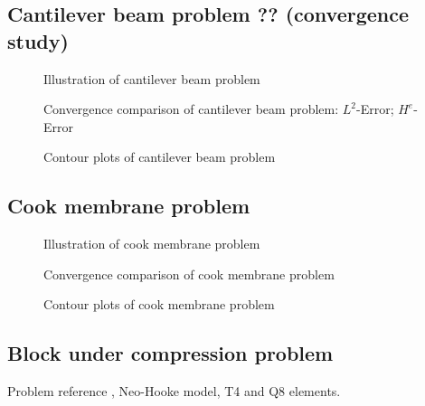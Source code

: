 \subsection{Cantilever beam problem ?? (convergence study)}

\begin{figure}[!ht]
\centering
\caption{Illustration of cantilever beam problem}\label{cantilever_illsutration}
\end{figure}

\begin{figure}[!ht]
\centering
\begin{subcaptiongroup}
    \label{cantilever_l2}
    \label{cantilever_h1}
\end{subcaptiongroup}
\caption{Convergence comparison of cantilever beam problem:  $L^2$-Error;  $H^e$-Error}\label{cantilever_illsutration}
\end{figure}

\begin{figure}[!ht]
\centering
\caption{Contour plots of cantilever beam problem}\label{cantilever_contour}
\end{figure}

\subsection{Cook membrane problem}

\begin{figure}[!ht]
\centering
\caption{Illustration of cook membrane problem}\label{cook_illsutration}
\end{figure}

\begin{figure}[!ht]
\centering
\caption{Convergence comparison of cook membrane problem}\label{cook_convergence}
\end{figure}

\begin{figure}[!ht]
\centering
\caption{Contour plots of cook membrane problem}\label{cook_contour}
\end{figure}

\subsection{Block under compression problem}
Problem reference \cite{reese2000}, Neo-Hooke model, T4 and Q8 elements.

